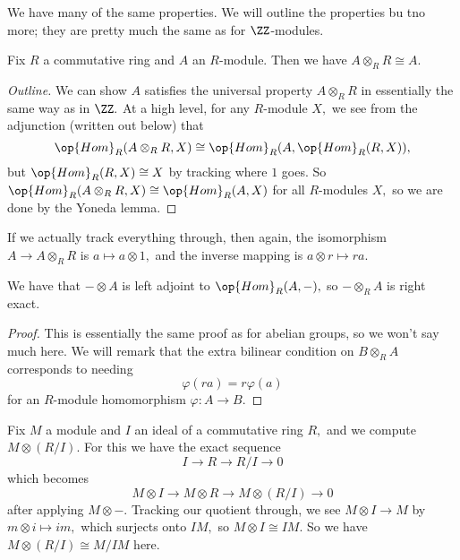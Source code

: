 We have many of the same properties. We will outline the properties bu tno more; they are pretty much the same as for $\ZZ$-modules.
\begin{proposition}
	Fix $R$ a commutative ring and $A$ an $R$-module. Then we have $A\otimes_R R\cong A.$
\end{proposition}
\begin{proof}[Outline]
	We can show $A$ satisfies the universal property $A\otimes_RR$ in essentially the same way as in $\ZZ.$ At a high level, for any $R$-module $X,$ we see from the adjunction (written out below) that
	\[\op{Hom}_R(A\otimes_RR,X)\cong\op{Hom}_R(A,\op{Hom}_R(R,X)),\]
	but $\op{Hom}_R(R,X)\cong X$ by tracking where $1$ goes. So $\op{Hom}_R(A\otimes_RR,X)\cong\op{Hom}_R(A,X)$ for all $R$-modules $X,$ so we are done by the Yoneda lemma.
\end{proof}
If we actually track everything through, then again, the isomorphism $A\to A\otimes_RR$ is $a\mapsto a\otimes1,$ and the inverse mapping is $a\otimes r\mapsto ra.$
\begin{proposition}
	We have that $-\otimes A$ is left adjoint to $\op{Hom}_R(A,-),$ so $-\otimes_RA$ is right exact.
\end{proposition}
\begin{proof}
	This is essentially the same proof as for abelian groups, so we won't say much here. We will remark that the extra bilinear condition on $B\otimes_RA$ corresponds to needing
	\[\varphi(ra)=r\varphi(a)\]
	for an $R$-module homomorphism $\varphi:A\to B.$
\end{proof}
\begin{example}
	Fix $M$ a module and $I$ an ideal of a commutative ring $R,$ and we compute $M\otimes(R/I).$ For this we have the exact sequence
	\[I\to R\to R/I\to 0\]
	which becomes
	\[M\otimes I\to M\otimes R\to M\otimes(R/I)\to0\]
	after applying $M\otimes-.$ Tracking our quotient through, we see $M\otimes I\to M$ by $m\otimes i\mapsto im,$ which surjects onto $IM,$ so $M\otimes I\cong IM.$ So we have $M\otimes(R/I)\cong M/IM$ here.
\end{example}


